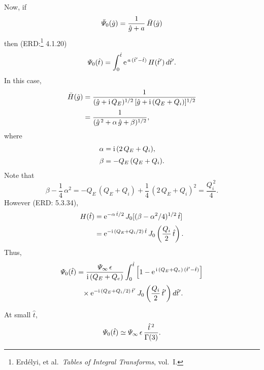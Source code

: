 \documentclass[titlepage=false,12pt]{article}
\begin{document}
Now, if
\begin{equation}
\bar{\mit\Psi}_0(\hat{g}) = \frac{1}{\hat{g} + a}\,\bar{H}(\hat{g})
\end{equation}
then (ERD:\footnote{Erd\'{e}lyi, et al.\ {\em Tables of Integral Transforms}, vol.~I.}
 4.1.20)\begin{equation}
{\mit\Psi}_0(\hat{t}) = \int_0^{\hat{t}}{\rm e}^{\,a\,(\hat{t}'-\hat{t})}\,H(\hat{t}')\,d\hat{t}'.
\end{equation}
In this case,
\begin{align}
\bar{H}(\hat{g}) &= \frac{1}{(\hat{g}+{\rm i}\,Q_E)^{1/2}\,[\hat{g} +{\rm i}\,(Q_E+Q_i)]^{1/2}}\\[0.5ex]
&=\frac{1}{(\hat{g}^{\,2}  + \alpha\,\hat{g} + \beta)^{1/2}},
\end{align}
where
\begin{align}
\alpha &= {\rm i}\,(2\,Q_E+Q_i),\\[0.5ex]
\beta&= - Q_E\,(Q_E+Q_i).
\end{align}
Note that
\begin{equation}
\beta- \frac{1}{4}\,\alpha^2 = -Q_E\,(Q_E+Q_i) +\frac{1}{4}\,(2\,Q_E+Q_i)^2 = \frac{Q_i^{\,2}}{4}.
\end{equation}
However (ERD: 5.3.34), 
\begin{align}
H(\hat{t}) &= {\rm e}^{-\alpha\,\hat{t}/2}\,J_0[(\beta-\alpha^2/4)^{1/2}\,\hat{t}]\\[0.5ex]
&= {\rm e}^{-{\rm i}\,(Q_E+Q_i/2)\,\hat{t}}\,J_0\left(\frac{Q_i}{2}\,\hat{t}\right).
\end{align}
Thus,
\begin{align}
{\mit\Psi}_0(\hat{t}) &=\frac{{\mit\Psi}_\infty\,\epsilon}{{\rm i}\,(Q_E+Q_e)}
\int_0^{\hat{t}}\left[1-{\rm e}^{\,{\rm i}\,(Q_E+Q_e)\,(\hat{t}'-\hat{t})}\right]\nonumber\\[0.5ex]&\phantom{=}\times 
{\rm e}^{-{\rm i}\,(Q_E+Q_i/2)\,\hat{t}'}\,J_0\left(\frac{Q_i}{2}\,\hat{t}'\right)d\hat{t}'.
\end{align}

At small $\hat{t}$,
\begin{equation}
{\mit\Psi}_0(\hat{t})\simeq {\mit\Psi}_\infty\,\epsilon\,\frac{\hat{t}^{\,2}}{\Gamma(3)}.
\end{equation}
\end{document}
